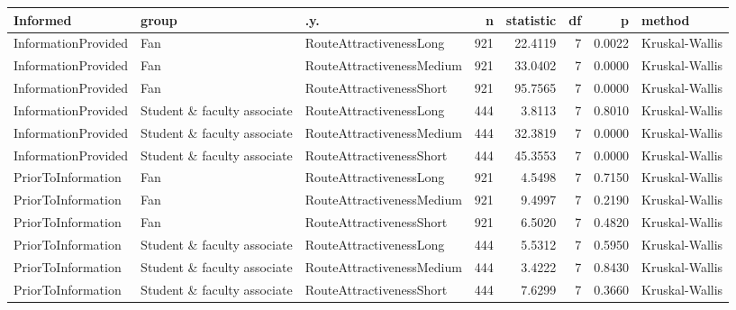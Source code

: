 \begin{tabular}{lllrrrrl}
  \hline
Informed & group & .y. & n & statistic & df & p & method \\ 
  \hline
InformationProvided & Fan & RouteAttractivenessLong &   921 & 22.4119 &     7 & 0.0022 & Kruskal-Wallis \\ 
  InformationProvided & Fan & RouteAttractivenessMedium &   921 & 33.0402 &     7 & 0.0000 & Kruskal-Wallis \\ 
  InformationProvided & Fan & RouteAttractivenessShort &   921 & 95.7565 &     7 & 0.0000 & Kruskal-Wallis \\ 
  InformationProvided & Student \& faculty associate & RouteAttractivenessLong &   444 & 3.8113 &     7 & 0.8010 & Kruskal-Wallis \\ 
  InformationProvided & Student \& faculty associate & RouteAttractivenessMedium &   444 & 32.3819 &     7 & 0.0000 & Kruskal-Wallis \\ 
  InformationProvided & Student \& faculty associate & RouteAttractivenessShort &   444 & 45.3553 &     7 & 0.0000 & Kruskal-Wallis \\ 
  PriorToInformation & Fan & RouteAttractivenessLong &   921 & 4.5498 &     7 & 0.7150 & Kruskal-Wallis \\ 
  PriorToInformation & Fan & RouteAttractivenessMedium &   921 & 9.4997 &     7 & 0.2190 & Kruskal-Wallis \\ 
  PriorToInformation & Fan & RouteAttractivenessShort &   921 & 6.5020 &     7 & 0.4820 & Kruskal-Wallis \\ 
  PriorToInformation & Student \& faculty associate & RouteAttractivenessLong &   444 & 5.5312 &     7 & 0.5950 & Kruskal-Wallis \\ 
  PriorToInformation & Student \& faculty associate & RouteAttractivenessMedium &   444 & 3.4222 &     7 & 0.8430 & Kruskal-Wallis \\ 
  PriorToInformation & Student \& faculty associate & RouteAttractivenessShort &   444 & 7.6299 &     7 & 0.3660 & Kruskal-Wallis \\ 
   \hline
\end{tabular}
